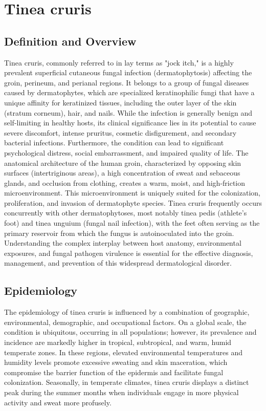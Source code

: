 \chapter{Tinea cruris}

\section*{Definition and Overview}
Tinea cruris, commonly referred to in lay terms as "jock itch," is a highly prevalent superficial cutaneous fungal infection (dermatophytosis) affecting the groin, perineum, and perianal regions. It belongs to a group of fungal diseases caused by dermatophytes, which are specialized keratinophilic fungi that have a unique affinity for keratinized tissues, including the outer layer of the skin (stratum corneum), hair, and nails. While the infection is generally benign and self-limiting in healthy hosts, its clinical significance lies in its potential to cause severe discomfort, intense pruritus, cosmetic disfigurement, and secondary bacterial infections. Furthermore, the condition can lead to significant psychological distress, social embarrassment, and impaired quality of life. The anatomical architecture of the human groin, characterized by opposing skin surfaces (intertriginous areas), a high concentration of sweat and sebaceous glands, and occlusion from clothing, creates a warm, moist, and high-friction microenvironment. This microenvironment is uniquely suited for the colonization, proliferation, and invasion of dermatophyte species. Tinea cruris frequently occurs concurrently with other dermatophytoses, most notably tinea pedis (athlete's foot) and tinea unguium (fungal nail infection), with the feet often serving as the primary reservoir from which the fungus is autoinoculated into the groin. Understanding the complex interplay between host anatomy, environmental exposures, and fungal pathogen virulence is essential for the effective diagnosis, management, and prevention of this widespread dermatological disorder.

\section*{Epidemiology}
The epidemiology of tinea cruris is influenced by a combination of geographic, environmental, demographic, and occupational factors. On a global scale, the condition is ubiquitous, occurring in all populations; however, its prevalence and incidence are markedly higher in tropical, subtropical, and warm, humid temperate zones. In these regions, elevated environmental temperatures and humidity levels promote excessive sweating and skin maceration, which compromise the barrier function of the epidermis and facilitate fungal colonization. Seasonally, in temperate climates, tinea cruris displays a distinct peak during the summer months when individuals engage in more physical activity and sweat more profusely.

